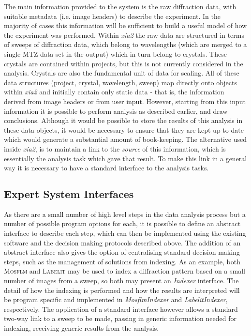 \documentclass[preprint,pdf]{iucr}
\begin{document}
The main information provided to the system is the raw diffraction
data, with suitable metadata (i.e. image headers) to describe the
experiment. In the majority of
cases this information will be sufficient to build
a useful model of how the experiment was performed. Within \emph{xia2}
the raw data are 
structured in terms of sweeps of diffraction data, which belong to
wavelengths (which are merged to a single MTZ data set in the output)
which in turn belong to crystals. These crystals are contained within
projects, but this is not currently considered in the analysis. Crystals
are also the fundamental unit of data for scaling. All of these
data structures (project, crystal, wavelength, sweep) map directly onto
objects within \emph{xia2} and initially contain only static data -
that is, the information derived from image headers or from user
input. However, starting from this input information it is possible to
perform analysis as described earlier, and draw 
conclusions. Although it would be possible to store the results of
this analysis in these data objects, it would be necessary to ensure
that they are kept up-to-date which would generate a substantial
amount of book-keeping. The alternative used inside
\emph{xia2}, is to maintain a link to the
\emph{source} of this information, which is essentially the analysis
task which gave that result. To make this link in a general
way it is necessary to have a standard interface to the analysis
tasks.

\subsection{Expert System Interfaces}

As there are a small number of high level steps in the data analysis
process but a number of possible program options for each, it is
possible to define an abstract interface to describe each step, which
can then be implemented using the existing software 
and the decision making protocols described above. The addition of an
abstract interface also gives the option of centralising standard
decision making steps, such as the management of solutions from
indexing. As an example, both \textsc{Mosflm} and \textsc{Labelit} may be used to index
a diffraction pattern based on a small number of images from a sweep,
so both may present an \emph{Indexer} interface. The detail of how the
indexing is performed and how the results are interpreted will be
program specific and implemented in \emph{MosflmIndexer} and
\emph{LabelitIndexer}, respectively. The application of a standard
interface however allows a standard two-way link to a sweep to be
made, passing in generic information needed for indexing, receiving
generic results from the analysis.
\end{document}
